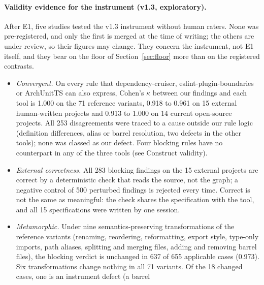 \documentclass[10pt,a4paper]{article}
\begin{document}
\paragraph{Validity evidence for the instrument (v1.3, exploratory).} After E1, five studies tested the v1.3
instrument without human raters. None was pre-registered, and only the first is merged at the time of writing; the
others are under review, so their figures may change. They concern the instrument, not E1 itself, and they bear on
the floor of Section~\ref{sec:floor} more than on the registered contrasts.
\begin{itemize}
  \item \emph{Convergent.} On every rule that dependency-cruiser, eslint-plugin-boundaries or ArchUnitTS can also
        express, Cohen's $\kappa$ between our findings and each tool is 1.000 on the 71 reference variants, 0.918 to
        0.961 on 15 external human-written projects and 0.913 to 1.000 on 14 current open-source projects. All 253
        disagreements were traced to a cause outside our rule logic (definition differences, alias or barrel
        resolution, two defects in the other tools); none was classed as our defect. Four blocking rules have no
        counterpart in any of the three tools (see Construct validity).
  \item \emph{External correctness.} All 283 blocking findings on the 15 external projects are correct by a
        deterministic check that reads the source, not the graph; a negative control of 500 perturbed findings is
        rejected every time. Correct is not the same as meaningful: the check shares the specification with the tool,
        and all 15 specifications were written by one session.
  \item \emph{Metamorphic.} Under nine semantics-preserving transformations of the reference variants (renaming,
        reordering, reformatting, export style, type-only imports, path aliases, splitting and merging files, adding
        and removing barrel files), the blocking verdict is unchanged in 637 of 655 applicable cases (0.973). Six
        transformations change nothing in all 71 variants. Of the 18 changed cases, one is an instrument defect (a barrel

\end{itemize}
\end{document}
